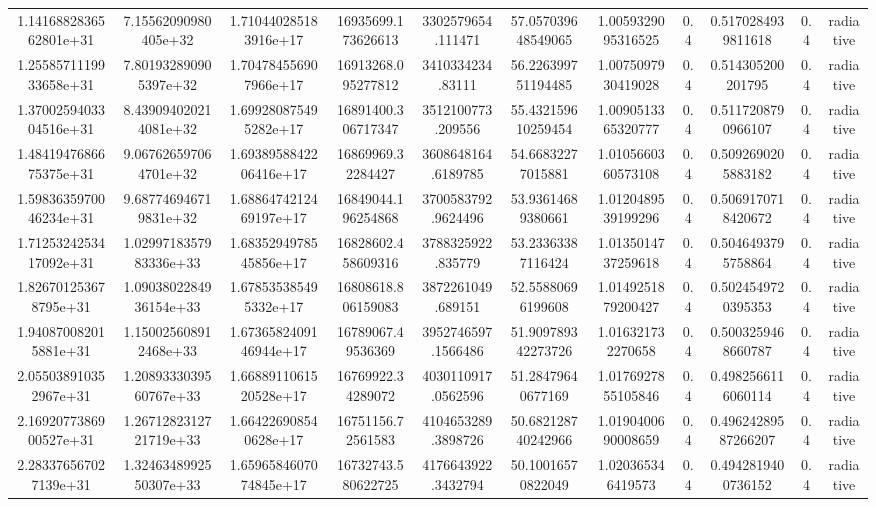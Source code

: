 \begin{table}
\begin{tabular}{ccccccccccc}
1.1416882836562801e+31 & 7.15562090980405e+32 & 1.710440285183916e+17 & 16935699.173626613 & 3302579654.111471 & 57.057039648549065 & 1.0059329095316525 & 0.4 & 0.5170284939811618 & 0.4 & radiative \\
1.2558571119933658e+31 & 7.801932890905397e+32 & 1.704784556907966e+17 & 16913268.095277812 & 3410334234.83111 & 56.226399751194485 & 1.0075097930419028 & 0.4 & 0.514305200201795 & 0.4 & radiative \\
1.3700259403304516e+31 & 8.439094020214081e+32 & 1.699280875495282e+17 & 16891400.306717347 & 3512100773.209556 & 55.432159610259454 & 1.0090513365320777 & 0.4 & 0.5117208790966107 & 0.4 & radiative \\
1.4841947686675375e+31 & 9.067626597064701e+32 & 1.6938958842206416e+17 & 16869969.32284427 & 3608648164.6189785 & 54.66832277015881 & 1.0105660360573108 & 0.4 & 0.5092690205883182 & 0.4 & radiative \\
1.5983635970046234e+31 & 9.687746946719831e+32 & 1.6886474212469197e+17 & 16849044.196254868 & 3700583792.9624496 & 53.93614689380661 & 1.0120489539199296 & 0.4 & 0.5069170718420672 & 0.4 & radiative \\
1.7125324253417092e+31 & 1.0299718357983336e+33 & 1.6835294978545856e+17 & 16828602.458609316 & 3788325922.835779 & 53.23363387116424 & 1.0135014737259618 & 0.4 & 0.5046493795758864 & 0.4 & radiative \\
1.826701253678795e+31 & 1.0903802284936154e+33 & 1.678535385495332e+17 & 16808618.806159083 & 3872261049.689151 & 52.55880696199608 & 1.0149251879200427 & 0.4 & 0.5024549720395353 & 0.4 & radiative \\
1.940870082015881e+31 & 1.150025608912468e+33 & 1.6736582409146944e+17 & 16789067.49536369 & 3952746597.1566486 & 51.909789342273726 & 1.016321732270658 & 0.4 & 0.5003259468660787 & 0.4 & radiative \\
2.055038910352967e+31 & 1.2089333039560767e+33 & 1.6688911061520528e+17 & 16769922.34289072 & 4030110917.0562596 & 51.28479640677169 & 1.0176927855105846 & 0.4 & 0.4982566116060114 & 0.4 & radiative \\
2.1692077386900527e+31 & 1.2671282312721719e+33 & 1.664226908540628e+17 & 16751156.72561583 & 4104653289.3898726 & 50.682128740242966 & 1.0190400690008659 & 0.4 & 0.49624289587266207 & 0.4 & radiative \\
2.283376567027139e+31 & 1.3246348992550307e+33 & 1.6596584607074845e+17 & 16732743.580622725 & 4176643922.3432794 & 50.10016570822049 & 1.020365346419573 & 0.4 & 0.4942819400736152 & 0.4 & radiative \\

\end{tabular}
\end{table}
